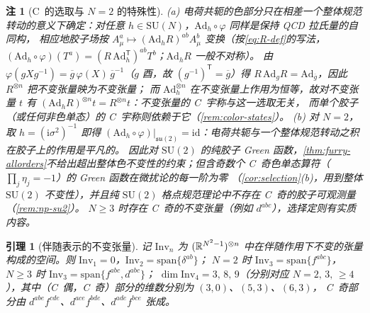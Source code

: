 \documentclass[UTF8,a4paper,11pt,fontset=fandol]{ctexart}
\let\amsmathbb\mathbb
\renewcommand{\mathbb}[1]{\ifx1#1\mathds{1}\else\amsmathbb{#1}\fi}
\theoremstyle{cplain}
\newtheorem{lemma}[theorem]{引理}
\theoremstyle{cdefinition}
\theoremstyle{cremark}
\newtheorem{remark}[theorem]{注}
\numberwithin{equation}{section}
\newcommand{\tp}{\mathsf{T}}                         %
\newcommand{\su}{\mathfrak{su}}
\newcommand{\ii}{\mathrm{i}}                        %
\begin{document}
\begin{remark}[C~的选取与 $N=2$ 的特殊性]\label{rem:color-su2}
(a) 电荷共轭的色部分只在相差一个整体规范转动的意义下确定：对任意 $h\in\mathrm{SU}(N)$，$\mathrm{Ad}_h\circ\varphi$ 同样是保持 QCD 拉氏量的自同构，
相应地胶子场按 $A^a_\mu\mapsto(\mathrm{Ad}_hR)^{ab}A^b_\mu$ 变换（按\cref{eq:R-def}的写法，$(\mathrm{Ad}_h\circ\varphi)(T^a)=(R\,\mathrm{Ad}_h^{\tp})^{ab}T^b$；$\mathrm{Ad}_hR$ 一般不对称）。
由 $\varphi(gXg^{-1})=\overline g\,\varphi(X)\,\overline g^{-1}$（$g$ 酉，故 $(g^{-1})^{\tp}=\overline g$）得 $R\,\mathrm{Ad}_gR=\mathrm{Ad}_{\overline g}$，因此 $R^{\otimes n}$ 把不变张量映为不变张量；
而 $\mathrm{Ad}_h^{\otimes n}$ 在不变张量上作用为恒等，故对不变张量 $t$ 有 $(\mathrm{Ad}_hR)^{\otimes n}t=R^{\otimes n}t$：\emph{不变张量的 \textup{C}~宇称与这一选取无关}，
而单个胶子（或任何非色单态）的 C~宇称则依赖于它（\cref{rem:color-states}）。
(b) 对 $N=2$，取 $h=(\ii\sigma^2)^{-1}$ 即得 $(\mathrm{Ad}_h\circ\varphi)|_{\su(2)}=\mathrm{id}$：电荷共轭与一个整体规范转动之积在胶子上的作用是平凡的。
因此对 $\mathrm{SU}(2)$ 的纯胶子 Green 函数，\cref{thm:furry-allorders}不给出超出整体色不变性的约束；但含奇数个 C~奇色单态算符（$\prod_j\eta_j=-1$）的 Green 函数在微扰论的每一阶为零
（\cref{cor:selection}(b)，用到整体 $\mathrm{SU}(2)$ 不变性），并且纯 $\mathrm{SU}(2)$ 格点规范理论中不存在 C~奇的胶子可观测量（\cref{rem:np-su2}）。
$N\ge3$ 时存在 C~奇的不变张量（例如 $d^{abc}$），选择定则有实质内容。
\end{remark}

\begin{lemma}[伴随表示的不变张量]\label{lem:invariants}
记 $\mathrm{Inv}_n$ 为 $(\mathbb R^{N^2-1})^{\otimes n}$ 中在伴随作用下不变的张量构成的空间。则
$\mathrm{Inv}_1=0$，$\mathrm{Inv}_2=\mathrm{span}\{\delta^{ab}\}$；
$N=2$ 时 $\mathrm{Inv}_3=\mathrm{span}\{f^{abc}\}$，$N\ge3$ 时 $\mathrm{Inv}_3=\mathrm{span}\{f^{abc},d^{abc}\}$；
$\dim\mathrm{Inv}_4=3,\,8,\,9$（分别对应 $N=2,\,3,\,\ge4$），其中（C~偶，C~奇）部分的维数分别为 $(3,0)$、$(5,3)$、$(6,3)$，
C~奇部分由 $d^{abe}f^{cde}$、$d^{ace}f^{bde}$、$d^{ade}f^{bce}$ 张成。
\end{lemma}
\end{document}
